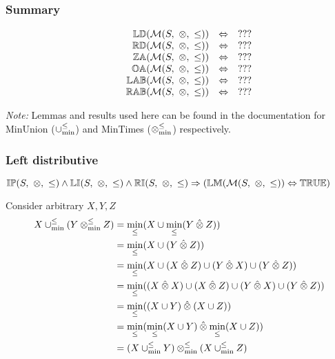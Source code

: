 \documentclass[../Summary.tex]{subfiles}
\begin{document}
\subsubsection{Summary}

\[
\begin{array}{lcrcl} 
& & {\mathbb{LD}}(\mathcal{M}(S,\ \otimes,\ \leq)) 
    & \Leftrightarrow 
    & ???
    \\ 
& & {\mathbb{RD}}(\mathcal{M}(S,\ \otimes,\ \leq)) 
    & \Leftrightarrow 
    & ???
    \\ 
& & {\mathbb{ZA}}(\mathcal{M}(S,\ \otimes,\ \leq)) 
    & \Leftrightarrow 
    & ???
    \\ 
& & {\mathbb{OA}}(\mathcal{M}(S,\ \otimes,\ \leq)) 
    & \Leftrightarrow 
    & ???
    \\  
& & {\mathbb{LAB}}(\mathcal{M}(S,\ \otimes,\ \leq)) 
    & \Leftrightarrow 
    & ???
    \\
& & {\mathbb{RAB}}(\mathcal{M}(S,\ \otimes,\ \leq)) 
    & \Leftrightarrow 
    & ???
    \\
\end{array} 
\] 


\emph{Note:} Lemmas and results used here can be found in the documentation for MinUnion ($\mathbin{\cup_{\min}^{\leq}}$) and MinTimes ($\mathbin{\otimes_{\min}^{\leq}}$) respectively.

\subsubsection{Left distributive}

$\propname{IP}(S,\ \otimes,\ \leq) \wedge \propname{LI}(S,\ \otimes,\ \leq) \wedge \propname{RI}(S,\ \otimes,\ \leq) \Rightarrow (\propname{LM}(\mathcal{M}(S,\ \otimes,\ \leq))  \Leftrightarrow \propname{TRUE})$

\proof

Consider arbitrary $X,Y,Z$
\begin{align*}
X \mathbin{\cup_{\min}^{\leq}} (Y \mathbin{\otimes_{\min}^{\leq}} Z) 	& = \min_\leq(X \cup \min_\leq(Y \mathbin{\hat{\otimes}} Z)) \\
							& = \min_\leq(X \cup (Y \mathbin{\hat{\otimes}} Z)) \\
							& = \min_\leq(X \cup (X \mathbin{\hat{\otimes}} Z) \cup (Y \mathbin{\hat{\otimes}} X) \cup (Y \mathbin{\hat{\otimes}} Z)) \\
							& = \min_\leq((X \mathbin{\hat{\otimes}} X) \cup (X \mathbin{\hat{\otimes}} Z) \cup (Y \mathbin{\hat{\otimes}} X) \cup (Y \mathbin{\hat{\otimes}} Z)) \\
							& = \min_\leq((X \cup Y) \mathbin{\hat{\otimes}} (X \cup Z)) \\
							& = \min_\leq(\min_\leq(X \cup Y) \mathbin{\hat{\otimes}} \min_\leq(X \cup Z)) \\
							& = (X \mathbin{\cup_{\min}^{\leq}} Y) \mathbin{\otimes_{\min}^{\leq}} (X \mathbin{\cup_{\min}^{\leq}} Z)
\end{align*}
\end{document}
